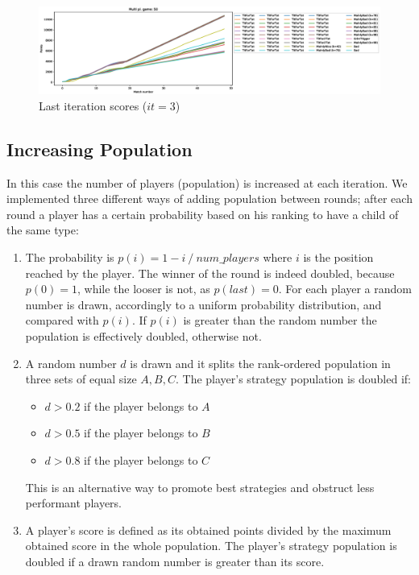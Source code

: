 \documentclass[journal,a4paper,10pt,twoside]{IEEEtran} %
\begin{document}
\begin{figure}[!ht]
    \centering
    \includegraphics[width=1\columnwidth]{../img/ripdmp-const/ripdmp-scores-const-pop-50-r3}
    \caption{Last iteration scores ($it=3$)}
    \label{fig:constLI}
\end{figure}

\subsection{Increasing Population}
In this case the number of players (population) is increased at each iteration. We implemented three different ways of adding population between rounds; after each round a player has a certain probability based on his ranking to have a child of the same type:
\begin{enumerate}
    \item The probability is $p(i)=1- i\ /\ num\_players$ where $i$ is the position reached by the player. The winner of the round is indeed doubled, because $p(0)=1$, while the looser is not, as $p(last)=0$.
    For each player a random number is drawn, accordingly to a uniform probability distribution, and compared with $p(i)$. If $p(i)$ is greater than the random number the population is effectively doubled, otherwise not.
    \item A random number $d$ is drawn and it splits the rank-ordered population in three sets of equal size $A,B,C$. The player's strategy population is doubled if:
    \begin{itemize}
        \item $d>0.2$ if the player belongs to $A$
        \item $d>0.5$ if the player belongs to $B$
        \item $d>0.8$ if the player belongs to $C$
    \end{itemize}
    This is an alternative way to promote best strategies and obstruct less performant players.
    \item A player's score is defined as its obtained points divided by the maximum obtained score in the whole population. The player's strategy population is doubled if a drawn random number is greater than its score.
\end{enumerate}
\end{document}
